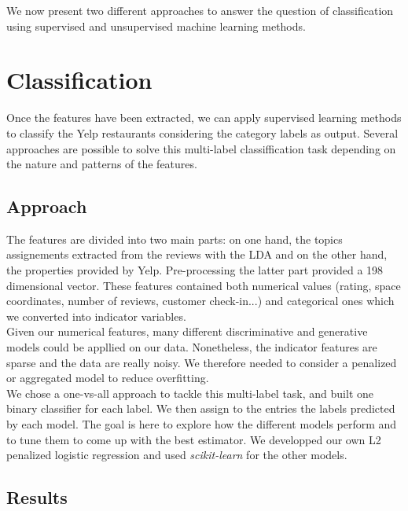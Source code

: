 \documentclass[twoside]{article}
\begin{document}
\begin{multicols}{2}
We now present two different approaches to answer the question of classification using supervised and unsupervised machine learning methods.\\

\section{Classification}

Once the features have been extracted, we can apply supervised learning methods to classify the Yelp restaurants considering the category labels as output. Several approaches are possible to solve this multi-label classiffication task depending on the nature and patterns of the features.

\subsection{Approach}

\noindent The features are divided into two main parts: on one hand, the topics assignements extracted from the reviews with the LDA and on the other hand, the properties provided by Yelp. Pre-processing the latter part provided a 198 dimensional vector. These features contained both numerical values (rating, space coordinates, number of reviews, customer check-in...) and categorical ones which we converted into indicator variables.\\

\noindent Given our numerical features, many different discriminative and generative models could be appllied on our data. Nonetheless, the indicator features are sparse and the data are really noisy. We therefore needed to consider a penalized or aggregated model to reduce overfitting.\\

\noindent We chose a one-vs-all approach to tackle this multi-label task, and built one binary classifier for each label. We then assign to the entries the labels predicted by each model. The goal is here to explore how the different models perform and to tune them to come up with the best estimator. We developped our own L2 penalized logistic regression and used \emph{scikit-learn} \cite{sklearn} for the other models.

\subsection{Results}


\end{multicols}
\end{document}
